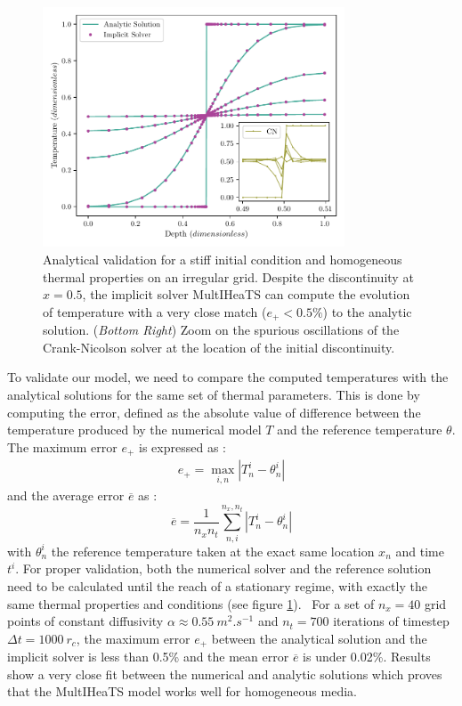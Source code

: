 \documentclass[]{interact}
\theoremstyle{plain}%
\theoremstyle{definition}
\theoremstyle{remark}
\begin{document}
\begin{figure}[htpb]
	\centering
	\includegraphics[width=0.8\textwidth]{figures/valid_ana.pdf}
	\caption{Analytical validation for a stiff initial condition and homogeneous thermal properties on an irregular grid. Despite the discontinuity at $x = 0.5 $, the implicit solver MultIHeaTS can compute the evolution of temperature with a very close match  ($e_+< 0.5\%$) to the analytic solution. (\textit{Bottom Right}) Zoom on the spurious oscillations of the Crank-Nicolson solver at the location of the initial discontinuity. }
	\label{fig:valid_ana}
\end{figure}

To validate our model, we need to compare the computed temperatures with the analytical solutions for the same set of thermal parameters. This is done by computing the error, defined as the absolute value of difference between the temperature produced by the numerical model $T$ and the reference temperature $\theta$. The maximum error $e_+$ is expressed as : 
\begin{align}
    e_+ = \max_{i,n} \left| T^i_n - \theta^i_n \right|
\end{align}
and the average error $\overline{e}$ as :
\begin{equation}
    \overline{e} = \frac{1}{n_x n_t} \sum_{n, i}^{n_x,n_t}\left| T^i_n - \theta^i_n \right|
\end{equation}
with $\theta^i_n$ the reference temperature taken at the exact same location $x_n$ and time $t^i$.
For proper validation, both the numerical solver and the reference solution need to be calculated until the reach of a stationary regime, with exactly the same thermal properties and conditions (see figure \ref{fig:valid_ana}). \
For a set of $n_x= 40$ grid points of constant diffusivity $\alpha \approx \SI{0.55}{m^2.s^{-1}}$ and $n_t=700$ iterations of timestep $\Delta t = 1000 \:  r_c$, the maximum error $e_+$ between the analytical solution and the implicit solver is less than 0.5\% and the mean error $\overline{e}$ is under 0.02\%.  
Results show a very close fit between the numerical and analytic solutions which proves that the MultIHeaTS model works well for homogeneous media.
\end{document}
